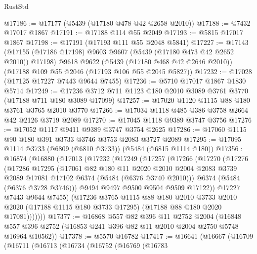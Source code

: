 \begin{lexlean}{RustStd}
\begin{coremodule}
{\begin{coremodule}
{{{{{{{{{{{{{{{{{{{{{{{{{{{{{{{@17186 := @17177 (@5439 (@17180 @478 @42 @2658 @2010))
@17188 := @7432 @17017 @1867
@17191 := @17188 @114 @55 @2049
@17193 := @5815 @17017 @1867
@17198 := @17191 (@17193 @111 @55 @2048 @5841)
@17227 := @17143
    (@17155 (@17186 @17198) @9603 @9607 (@5439 (@17180 @473 @42 @2652 @2010)) @17198)
    @9618
    @9622
    (@5439 (@17180 @468 @42 @2646 @2010))
    (@17188 @109 @55 @2046 (@17193 @106 @55 @2045 @5827))
@17232 := @17028 (@17125 @17227 @7443 @9644 @7455)
@17236 := @5710 @17017 @1867 @1830 @5714
@17249 := @17236 @3712 @711 @1123 @180 @2010 @3089 @3761 @3770 (@17188 @711 @180 @3089 @17099)
@17257 := @17020 @1120 @1115 @88 @180 @3761 @3765 @2010 @3770
@17266 := @17034 @1118 @485 @386 @3758 @2664 @42 @2126 @3719 @2089
@17270 := @17045 @1118 @9389 @3747 @3756
@17276 := @17052 @1117 @9411 @9389 @3747 @3754 @2625
@17286 := @17060 @1115 @90 @180 @391 @3733 @3746 @3753 @2083 @3727 @2089
@17295 := @17095 @1114 @3733 (@6809 (@6810 @3733)) (@5484 (@6815 @1114 @180))
@17356 := @16874
    (@16880
      (@17013
        (@17232
          (@17249
            (@17257
              (@17266
                (@17270
                  (@17276
                    (@17286
                      @17295
                      (@17061
                        @82
                        @180
                        @11
                        @2020
                        @2010
                        @2004
                        @2083
                        @3739
                        @2089
                        @17081
                        @17102
                        @6374
                        (@5484 (@6376 @3740 @2010)))
                      @6374
                      (@5484 (@6376 @3728 @3746)))
                    @9494
                    @9497
                    @9500
                    @9504
                    @9509
                    @17122))
                @17227
                @7443
                @9644
                @7455)
              (@17236
                @3765
                @1115
                @88
                @180
                @2010
                @3733
                @2010
                @2020
                (@17188 @1115 @180 @3733 @17295)
                (@17188 @88 @180 @2020 @17081)))))))
@17377 := @16868
    @557
    @82
    @396
    @11
    @2752
    @2004
    (@16848 @557 @396 @2752 (@16853 @241 @396 @82 @11 @2010 @2004 @2750 @5748 @16964 @10562))
@17378 := @5570 @16782
@17417 := @16641
    (@16667
      (@16709
        (@16711
          (@16713
            (@16734
              (@16752
                (@16769
                  (@16783
}}}}}}}}}}}}}}}}}}}}}}}}}}}}}}}
\end{coremodule}}
\end{coremodule}
\end{lexlean}
